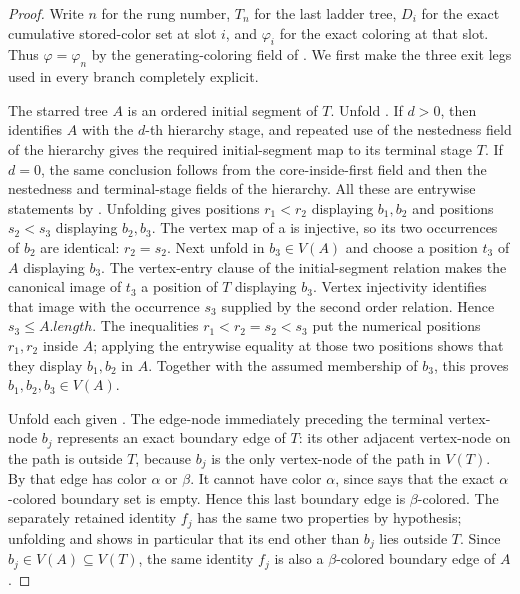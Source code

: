 \begin{proof}
Write $n$ for the rung number, $T_n$ for the last ladder tree, $D_i$ for
the exact cumulative stored-color set at slot $i$, and $\varphi_i$ for
the exact coloring at that slot.  Thus $\varphi=\varphi_n$ by the
generating-coloring field of .  We first
make the three exit legs used in every branch completely explicit.

The starred tree $A$ is an ordered initial segment of $T$.  Unfold
.  If $d>0$, then
 identifies $A$ with the $d$-th hierarchy
stage, and repeated use of the nestedness field of the hierarchy gives
the required initial-segment map to its terminal stage $T$.  If $d=0$,
the same conclusion follows from the core-inside-first field and then the
nestedness and terminal-stage fields of the hierarchy.  All these are
entrywise statements by .
Unfolding  gives positions $r_1<r_2$ displaying
$b_1,b_2$ and positions $s_2<s_3$ displaying $b_2,b_3$.  The vertex map
of a  is injective, so its two occurrences of
$b_2$ are identical: $r_2=s_2$.  Next unfold
 in $b_3\in V(A)$ and choose a position
$t_3$ of $A$ displaying $b_3$.  The vertex-entry clause of the
initial-segment relation makes the canonical image of $t_3$ a position
of $T$ displaying $b_3$.  Vertex injectivity identifies that image with
the occurrence $s_3$ supplied by the second order relation.  Hence
$s_3\leq A.\mathit{length}$.  The inequalities
$r_1<r_2=s_2<s_3$ put the numerical positions $r_1,r_2$ inside
$A$; applying the entrywise equality at those two positions shows that
they display $b_1,b_2$ in $A$.  Together with the assumed membership of
$b_3$, this proves $b_1,b_2,b_3\in V(A)$.

Unfold each given .  The edge-node immediately
preceding the terminal vertex-node $b_j$ represents an exact boundary
edge of $T$: its other adjacent vertex-node on the path is outside $T$,
because $b_j$ is the only vertex-node of the path in $V(T)$.  By
 that edge has color $\alpha$ or
$\beta$.  It cannot have color $\alpha$, since
 says that the exact $\alpha$-colored
boundary set is empty.  Hence this last boundary edge is
$\beta$-colored.  The separately retained identity $f_j$ has the same
two properties by hypothesis; unfolding 
and  shows in particular that its end other than
$b_j$ lies outside $T$.  Since $b_j\in V(A)\subseteq V(T)$, the same
identity $f_j$ is also a $\beta$-colored boundary edge of $A$.


\end{proof}
